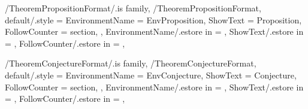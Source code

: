 
\pgfkeys
{
  /TheoremPropositionFormat/.is family, /TheoremPropositionFormat,
  default/.style =
  {
    EnvironmentName = {EnvProposition},
    ShowText = {Proposition},
    FollowCounter = section,
  },
  EnvironmentName/.estore in = \GetTheoremPropositionFormatEnvironmentName,
  ShowText/.estore in = \GetTheoremPropositionFormatShowText,
  FollowCounter/.estore in = \GetTheoremPropositionFormatFollowCounter,
} %

\newcommand{\InsertProposition}[2][\empty]
{%
  \InsertTheoremContent[#1]{\GetTheoremPropositionFormatEnvironmentName}{#2}%
} %

\newcommand{\InitTheoremPropositionFormat}
{%
  \theoremstyle{plain}%
  \ifthenelse{\equal{\GetTheoremPropositionFormatFollowCounter}{\empty}}%
  {%
    \newtheorem{%
      \GetTheoremPropositionFormatEnvironmentName}{%
      \GetTheoremPropositionFormatShowText}%
  }%
  {%
    \newtheorem{%
      \GetTheoremPropositionFormatEnvironmentName}{%
      \GetTheoremPropositionFormatShowText}[%
      \GetTheoremPropositionFormatFollowCounter]%
  }%
} %


\pgfkeys
{
  /TheoremConjectureFormat/.is family, /TheoremConjectureFormat,
  default/.style =
  {
    EnvironmentName = {EnvConjecture},
    ShowText = {Conjecture},
    FollowCounter = section,
  },
  EnvironmentName/.estore in = \GetTheoremConjectureFormatEnvironmentName,
  ShowText/.estore in = \GetTheoremConjectureFormatShowText,
  FollowCounter/.estore in = \GetTheoremConjectureFormatFollowCounter,
} %

\newcommand{\InsertConjecture}[2][\empty]
{%
  \InsertTheoremContent[#1]{\GetTheoremConjectureFormatEnvironmentName}{#2}%
} %

\newcommand{\InitTheoremConjectureFormat}
{%
  \theoremstyle{plain}%
  \ifthenelse{\equal{\GetTheoremConjectureFormatFollowCounter}{\empty}}%
  {%
    \newtheorem{%
      \GetTheoremConjectureFormatEnvironmentName}{%
      \GetTheoremConjectureFormatShowText}%
  }%
  {%
    \newtheorem{%
      \GetTheoremConjectureFormatEnvironmentName}{%
      \GetTheoremConjectureFormatShowText}[%
      \GetTheoremConjectureFormatFollowCounter]%
  }%
} %



